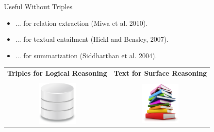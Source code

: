 \def\title{Useful Without Triples}
\begin{frame}{\title}
\begin{itemize}
\item $\dots$ for relation extraction (Miwa et al. 2010).
\item $\dots$ for textual entailment (Hickl and Bensley, 2007).
\item $\dots$ for summarization (Siddharthan et al. 2004).
\end{itemize}
\vspace{0.5cm}
\pause

\begin{center}
\begin{tabular}{cc}
\textbf{Triples for Logical Reasoning} & \textbf{Text for Surface Reasoning} \\
& \\
\includegraphics[width=2cm]{../../img/database.png} & 
  \includegraphics[width=2cm]{../../img/books.png}
\end{tabular}
\end{center}


\end{frame}
